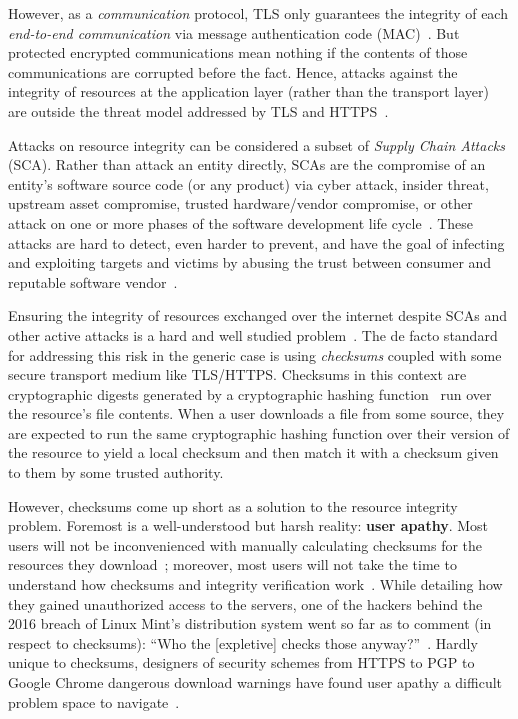 However, as a \textit{communication} protocol, TLS only guarantees the integrity
of each \textit{end-to-end communication} via message authentication code
(MAC)~\cite{TLS1.2}. But protected encrypted communications mean nothing if the
contents of those communications are corrupted before the fact. Hence, attacks
against the integrity of resources at the application layer (rather than the
transport layer) are outside the threat model addressed by TLS and
HTTPS~\cite{TLS1.2, HTTPS}.

Attacks on resource integrity can be considered a subset of \emph{Supply Chain
Attacks} (SCA). Rather than attack an entity directly, SCAs are the compromise
of an entity's software source code (or any product) via cyber attack, insider
threat, upstream asset compromise, trusted hardware/vendor compromise, or other
attack on one or more phases of the software development life
cycle~\cite{NIST-SCA}. These attacks are hard to detect, even harder to prevent,
and have the goal of infecting and exploiting targets and victims by abusing the
trust between consumer and reputable software vendor~\cite{SCA}.

Ensuring the integrity of resources exchanged over the internet despite SCAs and
other active attacks is a hard and well studied problem~\cite{MD5Header,
HTTP1.1, HTTPS, SRI, LF, OpenPGP1, DNSSEC, PKI, Cherubini, Stickler}. The de 
facto standard for addressing this risk in the generic case is using 
 \textit{checksums} coupled with some secure transport medium
like TLS/HTTPS. Checksums in this context are cryptographic digests generated by
a cryptographic hashing function~\cite{Rogaway} run over the resource's file
contents. When a user downloads a file from some source, they are expected to
run the same cryptographic hashing function over their version of the resource
to yield a local checksum and then match it with a checksum given to them by
some trusted authority.

However, checksums come up short as a solution to the resource integrity
problem. Foremost is a well-understood but harsh reality: \textbf{user apathy}.
Most users will not be inconvenienced with manually calculating checksums for
the resources they download~\cite{Cherubini, Fagan}; moreover, most users will
not take the time to understand how checksums and integrity verification
work~\cite{Cherubini, Tan, Hsiao}. While detailing how they gained unauthorized
access to the servers, one of the hackers behind the 2016 breach of Linux Mint's
distribution system went so far as to comment (in respect to checksums): ``Who
the [expletive] checks those anyway?''~\cite{SCA-MINT3}. Hardly unique to
checksums, designers of security schemes from HTTPS to PGP to Google Chrome
dangerous download warnings have found user apathy a difficult problem space to
navigate~\cite{PGPBad, Cherubini, Akhawe, ChromeClickThrough, Egelman1,
Egelman2, Modic, Reeder, Silic, Bianchi}.

